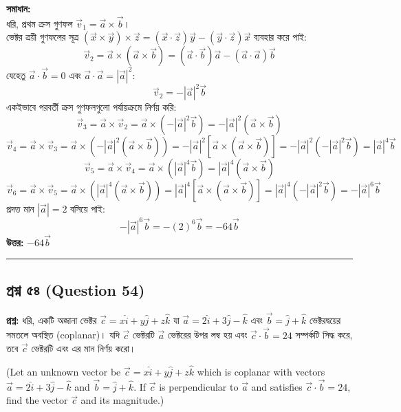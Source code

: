 \documentclass[12pt]{article}
\begin{document}
\textbf{সমাধান:} \\
ধরি, প্রথম ক্রস গুণফল $\vec{v}_1 = \vec{a} \times \vec{b}$। \\
ভেক্টর ত্রয়ী গুণফলের সূত্র $(\vec{x} \times \vec{y}) \times \vec{z} = (\vec{x} \cdot \vec{z})\vec{y} - (\vec{y} \cdot \vec{z})\vec{x}$ ব্যবহার করে পাই:
$$\vec{v}_2 = \vec{a} \times (\vec{a} \times \vec{b}) = (\vec{a} \cdot \vec{b})\vec{a} - (\vec{a} \cdot \vec{a})\vec{b}$$
যেহেতু $\vec{a} \cdot \vec{b} = 0$ এবং $\vec{a} \cdot \vec{a} = |\vec{a}|^2$:
$$\vec{v}_2 = -|\vec{a}|^2 \vec{b}$$
একইভাবে পরবর্তী ক্রস গুণফলগুলো পর্যায়ক্রমে নির্ণয় করি:
$$\vec{v}_3 = \vec{a} \times \vec{v}_2 = \vec{a} \times (-|\vec{a}|^2 \vec{b}) = -|\vec{a}|^2 (\vec{a} \times \vec{b})$$
$$\vec{v}_4 = \vec{a} \times \vec{v}_3 = \vec{a} \times \left( -|\vec{a}|^2 (\vec{a} \times \vec{b}) \right) = -|\vec{a}|^2 \left[ \vec{a} \times (\vec{a} \times \vec{b}) \right] = -|\vec{a}|^2 \left( -|\vec{a}|^2 \vec{b} \right) = |\vec{a}|^4 \vec{b}$$
$$\vec{v}_5 = \vec{a} \times \vec{v}_4 = \vec{a} \times \left( |\vec{a}|^4 \vec{b} \right) = |\vec{a}|^4 (\vec{a} \times \vec{b})$$
$$\vec{v}_6 = \vec{a} \times \vec{v}_5 = \vec{a} \times \left( |\vec{a}|^4 (\vec{a} \times \vec{b}) \right) = |\vec{a}|^4 \left[ \vec{a} \times (\vec{a} \times \vec{b}) \right] = |\vec{a}|^4 \left( -|\vec{a}|^2 \vec{b} \right) = -|\vec{a}|^6 \vec{b}$$
প্রদত্ত মান $|\vec{a}| = 2$ বসিয়ে পাই:
$$-|\vec{a}|^6 \vec{b} = -(2)^6 \vec{b} = -64\vec{b}$$
\textbf{উত্তর:} $-64\vec{b}$

\vspace{0.8cm}

\noindent\rule{\textwidth}{1pt}
\subsection*{প্রশ্ন ৫৪ (Question 54)}

\textbf{প্রশ্ন:} ধরি, একটি অজানা ভেক্টর $\vec{c} = x\hat{i} + y\hat{j} + z\hat{k}$ যা $\vec{a} = 2\hat{i} + 3\hat{j} - \hat{k}$ এবং $\vec{b} = \hat{j} + \hat{k}$ ভেক্টরদ্বয়ের সমতলে অবস্থিত (coplanar)। যদি $\vec{c}$ ভেক্টরটি $\vec{a}$ ভেক্টরের উপর লম্ব হয় এবং $\vec{c} \cdot \vec{b} = 24$ সম্পর্কটি সিদ্ধ করে, তবে $\vec{c}$ ভেক্টরটি এবং এর মান নির্ণয় করো।

(Let an unknown vector be $\vec{c} = x\hat{i} + y\hat{j} + z\hat{k}$ which is coplanar with vectors $\vec{a} = 2\hat{i} + 3\hat{j} - \hat{k}$ and $\vec{b} = \hat{j} + \hat{k}$. If $\vec{c}$ is perpendicular to $\vec{a}$ and satisfies $\vec{c} \cdot \vec{b} = 24$, find the vector $\vec{c}$ and its magnitude.)
\end{document}
